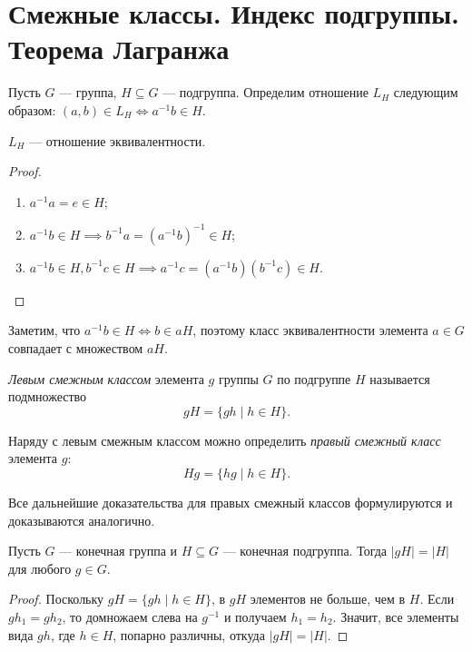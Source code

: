 \section{Смежные классы. Индекс подгруппы. Теорема Лагранжа}

Пусть $G$ --- группа, $H \subseteq G$ --- подгруппа. Определим отношение $L_H$ следующим образом: $(a, b) \in L_H \iff a^{-1} b \in H$.

\begin{proposal}
    $L_H$ --- отношение эквивалентности.
\end{proposal}

\begin{proof}~
    \begin{enumerate}[nosep]
    \item $a^{-1} a = e \in H$;
    \item $a^{-1} b \in H \implies b^{-1} a = (a^{-1} b)^{-1} \in H$;
    \item $a^{-1} b \in H, b ^{-1} c \in H \implies a^{-1} c = (a^{-1} b)(b^{-1} c) \in H$.
    \end{enumerate}
\end{proof}

Заметим, что $a^{-1} b \in H \iff b \in aH$, поэтому класс эквивалентности элемента $a \in G$ совпадает с множеством $aH$.

\begin{definition}
    \textit{Левым смежным классом} элемента $g$ группы $G$ по подгруппе $H$ называется подмножество
    \begin{equation*}
        gH = \{gh \mid h \in H\}
    .\end{equation*}

    Наряду с левым смежным классом можно определить \textit{правый смежный класс} элемента $g$:
    \begin{equation*}
        Hg = \{hg \mid h \in H\}
    .\end{equation*}
\end{definition}

Все дальнейшие доказательства для правых смежный классов формулируются и доказываются аналогично.

\begin{lemma}
    Пусть $G$ --- конечная группа и $H \subseteq G$ --- конечная подгруппа.
    Тогда $\left|gH\right| = \left|H\right|$ для любого $g \in G$.
\end{lemma}

\begin{proof}
    Поскольку $gH = \{gh \mid h \in H\}$, в $gH$ элементов не больше, чем в $H$.
    Если $g h_1 = gh_2$, то домножаем слева на $g^{-1}$ и получаем $h_1 = h_2$. Значит, все элементы вида $gh$, где $h \in H$, попарно различны, откуда $\left|gH\right| = \left|H\right|$.
\end{proof}


